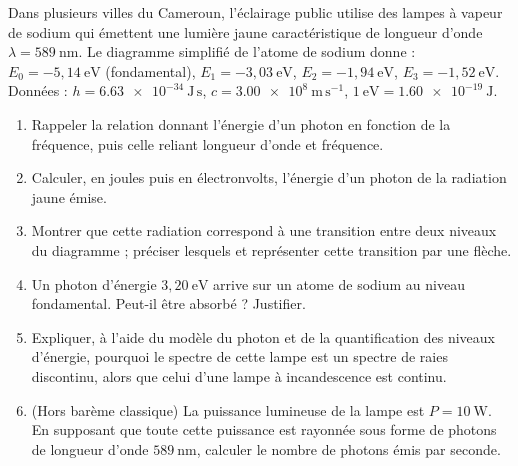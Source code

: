 \documentclass[11pt]{article}
\begin{document}
\begin{exercice}
Dans plusieurs villes du Cameroun, l'éclairage public utilise des lampes à vapeur de sodium qui émettent une lumière jaune caractéristique de longueur d'onde $\lambda = 589\ \mathrm{nm}$. Le diagramme simplifié de l'atome de sodium donne : $E_0 = -5{,}14\ \mathrm{eV}$ (fondamental), $E_1 = -3{,}03\ \mathrm{eV}$, $E_2 = -1{,}94\ \mathrm{eV}$, $E_3 = -1{,}52\ \mathrm{eV}$.\\
Données : $h = \num{6,63e-34}\ \mathrm{J\,s}$, $c = \num{3,00e8}\ \mathrm{m\,s^{-1}}$, $1\ \mathrm{eV} = \num{1,60e-19}\ \mathrm{J}$.
\begin{enumerate}
\item Rappeler la relation donnant l'énergie d'un photon en fonction de la fréquence, puis celle reliant longueur d'onde et fréquence.
\item Calculer, en joules puis en électronvolts, l'énergie d'un photon de la radiation jaune émise.
\item Montrer que cette radiation correspond à une transition entre deux niveaux du diagramme ; préciser lesquels et représenter cette transition par une flèche.
\item Un photon d'énergie $3{,}20\ \mathrm{eV}$ arrive sur un atome de sodium au niveau fondamental. Peut-il être absorbé ? Justifier.
\item Expliquer, à l'aide du modèle du photon et de la quantification des niveaux d'énergie, pourquoi le spectre de cette lampe est un spectre de raies discontinu, alors que celui d'une lampe à incandescence est continu.
\item (Hors barème classique) La puissance lumineuse de la lampe est $P = 10\ \mathrm{W}$. En supposant que toute cette puissance est rayonnée sous forme de photons de longueur d'onde $589\ \mathrm{nm}$, calculer le nombre de photons émis par seconde.
\end{enumerate}
\end{exercice}
\end{document}
